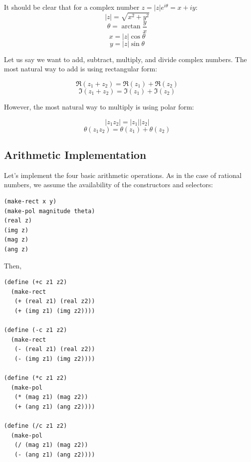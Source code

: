 \documentclass[9pt]{report}
\begin{document}
\begin{center}
\end{center}

It should be clear that for a complex number \(z=|z|e^{i\theta}=x+iy\):
$$|z|=\sqrt{x^{2}+y^{2}}$$
$$\theta = \arctan{\frac{y}{x}}$$
$$x=|z|\cos{\theta}$$
$$y=|z|\sin{\theta}$$

Let us say we want to add, subtract, multiply, and divide complex
numbers. The most natural way to add is using rectangular form:

$$\Re{(z_1+z_2)} = \Re{(z_1)} + \Re{(z_2)}$$
$$\Im{(z_1+z_2)} = \Im{(z_1)} + \Im{(z_2)}$$

However, the most natural way to multiply is using polar form:

$$|z_1z_2|=|z_1||z_2|$$
$$\theta{(z_1z_2)} = \theta{(z_1)}+\theta{(z_2)}$$

\subsection{Arithmetic Implementation}
\label{sec:org2cbcd44}

Let's implement the four basic arithmetic operations. As in the
case of rational numbers, we assume the availability of the
constructors and selectors:

\begin{verbatim}
(make-rect x y)
(make-pol magnitude theta)
(real z)
(img z)
(mag z)
(ang z)
\end{verbatim}

Then,

\begin{verbatim}
(define (+c z1 z2)
  (make-rect
   (+ (real z1) (real z2))
   (+ (img z1) (img z2))))

(define (-c z1 z2)
  (make-rect
   (- (real z1) (real z2))
   (- (img z1) (img z2))))

(define (*c z1 z2)
  (make-pol
   (* (mag z1) (mag z2))
   (+ (ang z1) (ang z2))))

(define (/c z1 z2)
  (make-pol
   (/ (mag z1) (mag z2))
   (- (ang z1) (ang z2))))
\end{verbatim}
\end{document}
